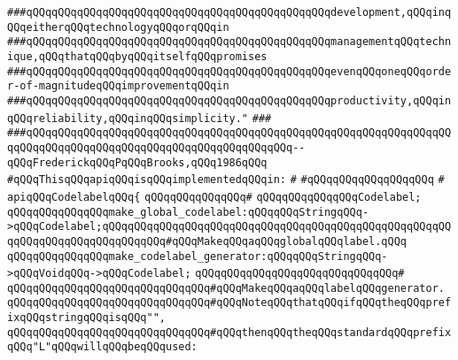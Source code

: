 \verb|###qQQqqQQqqQQqqQQqqQQqqQQqqQQqqQQqqQQqqQQqqQQqqQQqdevelopment,qQQqinqQQqeitherqQQqtechnologyqQQqorqQQqin|\newline
\verb|###qQQqqQQqqQQqqQQqqQQqqQQqqQQqqQQqqQQqqQQqqQQqqQQqmanagementqQQqtechnique,qQQqthatqQQqbyqQQqitselfqQQqpromises|\newline
\verb|###qQQqqQQqqQQqqQQqqQQqqQQqqQQqqQQqqQQqqQQqqQQqqQQqevenqQQqoneqQQqorder-of-magnitudeqQQqimprovementqQQqin|\newline
\verb|###qQQqqQQqqQQqqQQqqQQqqQQqqQQqqQQqqQQqqQQqqQQqqQQqproductivity,qQQqinqQQqreliability,qQQqinqQQqsimplicity."|\newline
\verb|###|\newline
\verb|###qQQqqQQqqQQqqQQqqQQqqQQqqQQqqQQqqQQqqQQqqQQqqQQqqQQqqQQqqQQqqQQqqQQqqQQqqQQqqQQqqQQqqQQqqQQqqQQqqQQqqQQqqQQqqQQq--qQQqFrederickqQQqPqQQqBrooks,qQQq1986qQQq|\newline
\newline
\newline
\verb|#qQQqThisqQQqapiqQQqisqQQqimplementedqQQqin:|\newline
\verb|#|\newline
\verb|#qQQqqQQqqQQqqQQqqQQq|\newline
\verb|#|\newline
\verb|apiqQQqCodelabelqQQq{|\newline
\verb|qQQqqQQqqQQqqQQq#|\newline
\verb|qQQqqQQqqQQqqQQqCodelabel;|\newline
\newline
\verb|qQQqqQQqqQQqqQQqmake_global_codelabel:qQQqqQQqStringqQQq->qQQqCodelabel;qQQqqQQqqQQqqQQqqQQqqQQqqQQqqQQqqQQqqQQqqQQqqQQqqQQqqQQqqQQqqQQqqQQqqQQqqQQqqQQq#qQQqMakeqQQqaqQQqglobalqQQqlabel.qQQq|\newline
\newline
\verb|qQQqqQQqqQQqqQQqmake_codelabel_generator:qQQqqQQqStringqQQq->qQQqVoidqQQq->qQQqCodelabel;|\newline
\verb|qQQqqQQqqQQqqQQqqQQqqQQqqQQqqQQq#|\newline
\verb|qQQqqQQqqQQqqQQqqQQqqQQqqQQqqQQq#qQQqMakeqQQqaqQQqlabelqQQqgenerator.|\newline
\verb|qQQqqQQqqQQqqQQqqQQqqQQqqQQqqQQq#qQQqNoteqQQqthatqQQqifqQQqtheqQQqprefixqQQqstringqQQqisqQQq"",|\newline
\verb|qQQqqQQqqQQqqQQqqQQqqQQqqQQqqQQq#qQQqthenqQQqtheqQQqstandardqQQqprefixqQQq"L"qQQqwillqQQqbeqQQqused:|\newline
